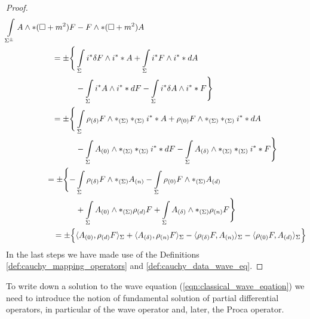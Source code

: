 \begin{proof}
\begin{align}
 \int\limits_{\Sigma^\pm} A \wedge * (\square + m^2) F &- F \wedge * (\square + m^2) A   \\
 = \pm  \Bigg\{ &\int\limits_{\Sigma} i^* \delta F \wedge i^* *A + \int\limits_{\Sigma}  i^* F \wedge i^* *dA \notag \\
 &- \int\limits_{\Sigma} i^* A \wedge i^* *dF - \int\limits_{\Sigma}  i^* \delta A \wedge i^* *F  \Bigg\} \notag \\
 = \pm  \Bigg\{ &\int\limits_{\Sigma} \rho_{(\delta)} F \wedge *_{(\Sigma)} *_{(\Sigma)} i^* *A + \rho_{(0)} F \wedge *_{(\Sigma)} *_{(\Sigma)} i^* *dA \notag \\
 &- \int\limits_{\Sigma} {A_{(0)}} \wedge *_{(\Sigma)} *_{(\Sigma)} i^* *dF -\int\limits_{\Sigma} {A_{(\delta)}} \wedge *_{(\Sigma)} *_{(\Sigma)} i^* *F  \Bigg\} \notag \\
 = \pm  \Bigg\{- &\int\limits_{\Sigma} \rho_{(\delta)} F \wedge *_{(\Sigma)} {A_{(n)}} -  \int\limits_{\Sigma} \rho_{(0)} F \wedge *_{(\Sigma)} {A_{(d)}} \notag \\
 &+ \int\limits_{\Sigma} {A_{(0)}} \wedge *_{(\Sigma)} \rho_{(d)} F +\int\limits_{\Sigma}  {A_{(\delta)}} \wedge *_{(\Sigma)} \rho_{(n)} F  \Bigg\} \notag \\
 = \pm  \Big\{ &\langle {A_{(0)}} , \rho_{(d)} F \rangle_\Sigma +\langle  {A_{(\delta)}} , \rho_{(n)} F \rangle_\Sigma
 - \langle \rho_{(\delta)} F , {A_{(n)}} \rangle_\Sigma -  \langle \rho_{(0)} F , {A_{(d)}} \rangle_\Sigma \Big\}  \notag
\end{align}
In the last steps we have made use of the Definitions \ref{def:cauchy_mapping_operators} and  \ref{def:cauchy_data_wave_eq}.
\end{proof}
%
To write down a solution to the wave equation (\ref{eqn:classical_wave_eqation}) we need to introduce the notion of fundamental solution of partial differential operators, in particular of the wave operator and, later, the Proca operator.

